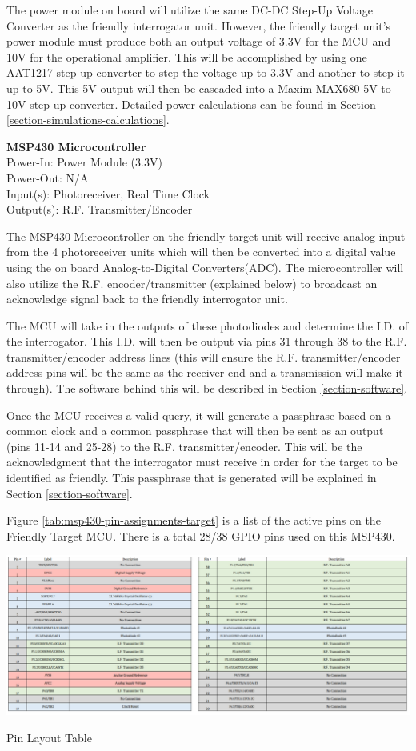 \documentclass[letterpaper,10pt]{article}
\begin{document}
\begin{spacing}{1.15}
The power module on board will utilize the same DC-DC Step-Up Voltage Converter as the friendly interrogator unit. However, the friendly target unit's power module must produce both an output voltage of 3.3V for the MCU and 10V for the operational amplifier. This will be accomplished by using one AAT1217 step-up converter to step the voltage up to 3.3V and another to step it up to 5V. This 5V output will then be cascaded into a Maxim MAX680 5V-to-10V step-up converter. Detailed power calculations can be found in Section \ref{section-simulations-calculations}.

\normalsize\textbf{MSP430 Microcontroller} \\
Power-In: Power Module (3.3V)\\
Power-Out: N/A \\
Input(s): Photoreceiver, Real Time Clock\\
Output(s): R.F. Transmitter/Encoder

The MSP430 Microcontroller on the friendly target unit will receive analog input from the 4 photoreceiver units which will then be converted into a digital value using the on board Analog-to-Digital Converters(ADC). The microcontroller will also utilize the R.F. encoder/transmitter (explained below) to broadcast an acknowledge signal back to the friendly interrogator unit.

The MCU will take in the outputs of these photodiodes and determine the I.D. of the interrogator. This I.D. will then be output via pins 31 through 38 to the R.F. transmitter/encoder address lines (this will ensure the R.F. transmitter/encoder address pins will be the same as the receiver end and a transmission will make it through). The software behind this will be described in Section \ref{section-software}.

Once the MCU receives a valid query, it will generate a passphrase based on a common clock and a common passphrase that will then be sent as an output (pins 11-14 and 25-28) to the R.F. transmitter/encoder. This will be the acknowledgment that the interrogator must receive in order for the target to be identified as friendly. This passphrase that is generated will be explained in Section \ref{section-software}.

Figure \ref{tab:msp430-pin-assignments-target} is a list of the active pins on the Friendly Target MCU. There is a total 28/38 GPIO pins used on this MSP430.

\begin{table} [H]
	\centering
		\includegraphics[scale=0.52]{MSP430_Pin_Assignments-Target.png}
	\caption{Pin Layout Table\label{tab:msp430-pin-assignments-target}}
\end{table}


\end{spacing}
\end{document}
